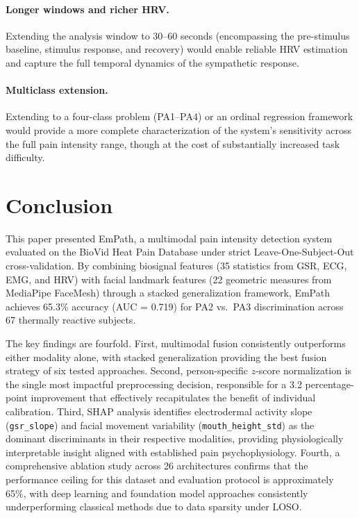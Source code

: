 \documentclass[10pt, twocolumn]{article}
\begin{document}
\paragraph{Longer windows and richer HRV.}
Extending the analysis window to 30--60 seconds (encompassing the pre-stimulus baseline,
stimulus response, and recovery) would enable reliable HRV estimation and capture the full
temporal dynamics of the sympathetic response.

\paragraph{Multiclass extension.}
Extending to a four-class problem (PA1--PA4) or an ordinal regression framework would
provide a more complete characterization of the system's sensitivity across the full pain
intensity range, though at the cost of substantially increased task difficulty.

\section{Conclusion}
\label{sec:conclusion}

This paper presented EmPath, a multimodal pain intensity detection system evaluated on the
BioVid Heat Pain Database under strict Leave-One-Subject-Out cross-validation. By combining
biosignal features (35 statistics from GSR, ECG, EMG, and HRV) with facial landmark
features (22 geometric measures from MediaPipe FaceMesh) through a stacked generalization
framework, EmPath achieves 65.3\% accuracy (AUC = 0.719) for PA2 vs.\ PA3 discrimination
across 67 thermally reactive subjects.

The key findings are fourfold. First, multimodal fusion consistently outperforms either
modality alone, with stacked generalization providing the best fusion strategy of six
tested approaches. Second, person-specific $z$-score normalization is the single most
impactful preprocessing decision, responsible for a 3.2 percentage-point improvement that
effectively recapitulates the benefit of individual calibration. Third, SHAP analysis
identifies electrodermal activity slope (\texttt{gsr\_slope}) and facial movement
variability (\texttt{mouth\_height\_std}) as the dominant discriminants in their respective
modalities, providing physiologically interpretable insight aligned with established pain
psychophysiology. Fourth, a comprehensive ablation study across 26 architectures confirms
that the performance ceiling for this dataset and evaluation protocol is approximately 65\%,
with deep learning and foundation model approaches consistently underperforming classical
methods due to data sparsity under LOSO.
\end{document}
